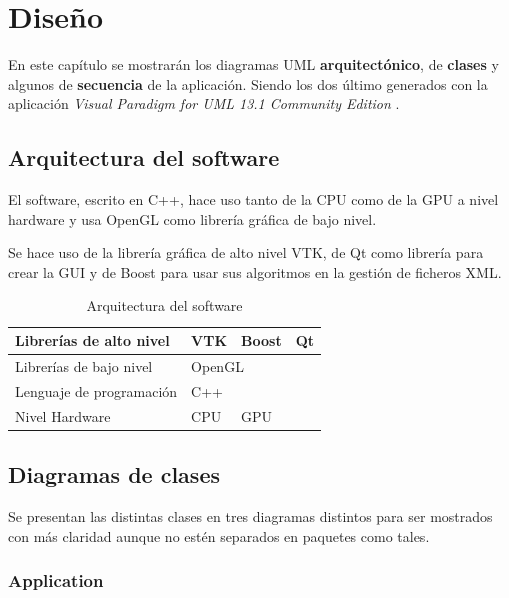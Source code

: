 \chapter{Diseño}

En este capítulo se mostrarán los diagramas UML \textbf{arquitectónico}, de \textbf{clases} y algunos de \textbf{secuencia} de la aplicación. Siendo los dos último generados con la aplicación \textit{Visual Paradigm for UML 13.1 Community Edition} \cite{vpp}.

\section{Arquitectura del software}

El software, escrito en C++, hace uso tanto de la CPU como de la GPU a nivel hardware y usa OpenGL como librería gráfica de bajo nivel.

Se hace uso de la librería gráfica de alto nivel VTK, de Qt como librería para crear la GUI y de Boost para usar sus algoritmos en la gestión de ficheros XML.

\begin{table}[H]
	\begin{center}
		\begin{tabular}{|l|c|c|c|c|}
			\hline
			Librerías de alto nivel  & \multicolumn{2}{l|}{VTK} & Boost        & Qt        \\ \hline
			Librerías de bajo nivel  & \multicolumn{4}{l|}{OpenGL}                         \\ \hline
			Lenguaje de programación & \multicolumn{4}{l|}{C++}                            \\ \hline
			Nivel Hardware           & \multicolumn{2}{l|}{CPU} & \multicolumn{2}{l|}{GPU} \\ \hline
		\end{tabular}
	\end{center}
	\caption{Arquitectura del software}
	\label{tab:diagrama_arquitectonico}
\end{table}

\section{Diagramas de clases}

Se presentan las distintas clases en tres diagramas distintos para ser mostrados con más claridad aunque no estén separados en paquetes como tales.

\subsection{Application}

